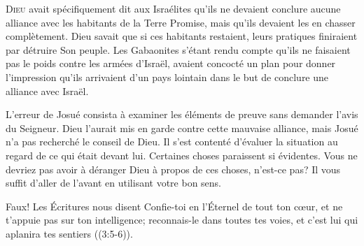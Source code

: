 





\lettrine{D}{ieu} avait spécifiquement dit aux Israélites
 qu'ils ne devaient conclure aucune alliance avec les habitants
 de la Terre Promise, mais qu'ils devaient les en chasser complètement.
 Dieu savait que si ces habitants restaient, leurs pratiques finiraient
 par détruire Son peuple.
 Les Gabaonites s'étant rendu compte qu'ils ne faisaient
 pas le poids contre les armées d'Israël,
 avaient concocté un plan pour donner l'impression
 qu'ils arrivaient d'un pays lointain
 dans le but de conclure une alliance avec Israël.

L'erreur de Josué consista à examiner les éléments de preuve
 sans demander l'avis du Seigneur.
 Dieu l'aurait mis en garde contre cette mauvaise alliance,
 mais Josué n'a pas recherché le conseil de Dieu.
 Il s'est contenté d'évaluer la situation au regard de ce qui était devant lui.
 Certaines choses paraissent si évidentes.
 Vous ne devriez pas avoir à déranger Dieu à propos de ces choses,
 n'est-ce pas? 
 Il vous suffit d'aller de l'avant en utilisant votre bon sens.

Faux! Les Écritures nous disent\frcolon{}
 \Og Confie-toi en l'Éternel de tout ton c\oe{}ur,
 et ne t'appuie pas sur ton intelligence;
 reconnais-le dans toutes tes voies,
 et c'est lui qui aplanira tes sentiers \Fg{} ((3:5-6)).


